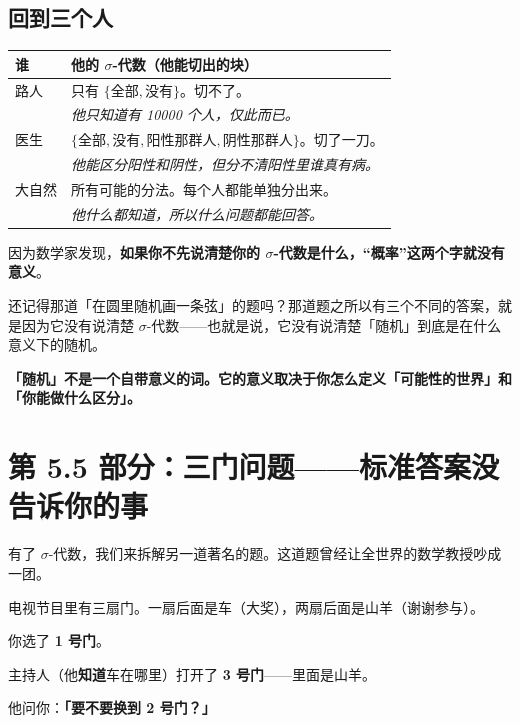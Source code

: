 \documentclass[12pt,a4paper]{article}
\begin{document}
\subsection*{回到三个人}

\begin{center}
\renewcommand{\arraystretch}{1.8}
\begin{tabular}{lp{9cm}}
\textbf{谁} & \textbf{他的 $\sigma$-代数（他能切出的块）} \\
\hline
路人 & 只有 $\{\text{全部}, \text{没有}\}$。切不了。\\
      & \textit{\small 他只知道有 10000 个人，仅此而已。} \\
医生 & $\{\text{全部}, \text{没有}, \text{阳性那群人}, \text{阴性那群人}\}$。切了一刀。\\
      & \textit{\small 他能区分阳性和阴性，但分不清阳性里谁真有病。} \\
大自然 & 所有可能的分法。每个人都能单独分出来。\\
      & \textit{\small 他什么都知道，所以什么问题都能回答。} \\
\end{tabular}
\end{center}

\begin{mathbox}[为什么这东西重要？]
因为数学家发现，\textbf{如果你不先说清楚你的 $\sigma$-代数是什么，``概率''这两个字就没有意义}。

还记得那道「在圆里随机画一条弦」的题吗？那道题之所以有三个不同的答案，就是因为它没有说清楚 $\sigma$-代数——也就是说，它没有说清楚「随机」到底是在什么意义下的随机。

\textbf{「随机」不是一个自带意义的词。它的意义取决于你怎么定义「可能性的世界」和「你能做什么区分」。}
\end{mathbox}

\section*{第 5.5 部分：三门问题——标准答案没告诉你的事}

有了 $\sigma$-代数，我们来拆解另一道著名的题。这道题曾经让全世界的数学教授吵成一团。

\begin{storybox}
电视节目里有三扇门。一扇后面是车（大奖），两扇后面是山羊（谢谢参与）。

你选了 \textbf{1 号门}。

主持人（他\textbf{知道}车在哪里）打开了 \textbf{3 号门}——里面是山羊。

他问你：\textbf{「要不要换到 2 号门？」}
\end{storybox}
\end{document}

